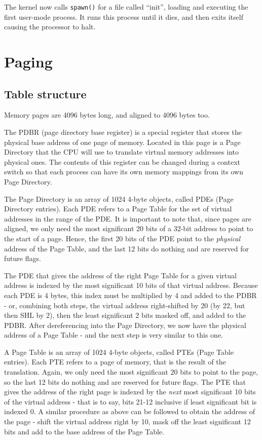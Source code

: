 \documentclass[12pt,a4paper]{report}
\begin{document}
The kernel now calls \texttt{spawn()} for a file called ``init'', loading and executing the first user-mode process. It runs this process until it dies, and then exits itself causing the processor to halt.

\section{Paging} \label{kpaging}

\subsection*{Table structure}
Memory pages are 4096 bytes long, and aligned to 4096 bytes too.

The PDBR (page directory base register) is a special register that stores the physical base address of one page of memory. Located in this page is a Page Directory that the CPU will use to translate virtual memory addresses into physical ones. The contents of this register can be changed during a context switch so that each process can have its own memory mappings from its own Page Directory.

The Page Directory is an array of 1024 4-byte objects, called PDEs (Page Directory entries). Each PDE refers to a Page Table for the set of virtual addresses in the range of the PDE. It is important to note that, since pages are aligned, we only need the most significant 20 bits of a 32-bit address to point to the start of a page. Hence, the first 20 bits of the PDE point to the \emph{physical} address of the Page Table, and the last 12 bits do nothing and are reserved for future flags.

The PDE that gives the address of the right Page Table for a given virtual address is indexed by the most significant 10 bits of that virtual address. Because each PDE is 4 bytes, this index must be multiplied by 4 and added to the PDBR - or, combining both steps, the virtual address right-shifted by 20 (by 22, but then SHL by 2), then the least significant 2 bits masked off, and added to the PDBR. After dereferencing into the Page Directory, we now have the physical address of a Page Table - and the next step is very similar to this one.

A Page Table is an array of 1024 4-byte objects, called PTEs (Page Table entries). Each PTE refers to a page of memory, that is the result of the translation. Again, we only need the most significant 20 bits to point to the page, so the last 12 bits do nothing and are reserved for future flags. The PTE that gives the address of the right page is indexed by the \emph{next} most significant 10 bits of the virtual address - that is to say, bits 21-12 inclusive if least significant bit is indexed 0. A similar procedure as above can be followed to obtain the address of the page - shift the virtual address right by 10, mask off the least significant 12 bits and add to the base address of the Page Table.
\end{document}
